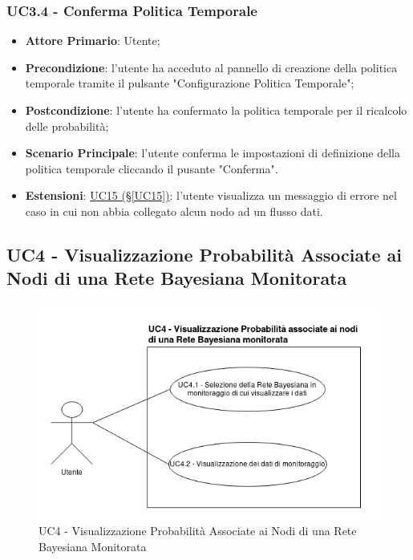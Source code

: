 \subsubsection{UC3.4 - Conferma Politica Temporale}\label{UC3.4}
\begin{itemize}
	\item \textbf{Attore Primario}: Utente;
	\item \textbf{Precondizione}: l'utente ha acceduto al pannello di creazione della politica temporale tramite il pulsante "Configurazione Politica Temporale";
	\item \textbf{Postcondizione}: l'utente ha confermato la politica temporale per il ricalcolo delle probabilità;
	\item \textbf{Scenario Principale}: l'utente conferma le impostazioni di definizione della politica temporale cliccando il pusante "Conferma".
	\item \textbf{Estensioni}: \hyperref[UC15]{UC15 (§\ref*{UC15})}: l'utente visualizza un messaggio di errore nel caso in cui non abbia collegato alcun nodo ad un flusso dati.
\end{itemize}

\newpage

\subsection{UC4 - Visualizzazione Probabilità Associate ai Nodi di una Rete Bayesiana Monitorata}\label{UC4}

\begin{figure}[H]
	\begin{center}
		\includegraphics[scale=0.6]{./images/UC4.png}
		 \caption{UC4 - Visualizzazione Probabilità Associate ai Nodi di una Rete Bayesiana Monitorata}
	\end{center}
\end{figure}

